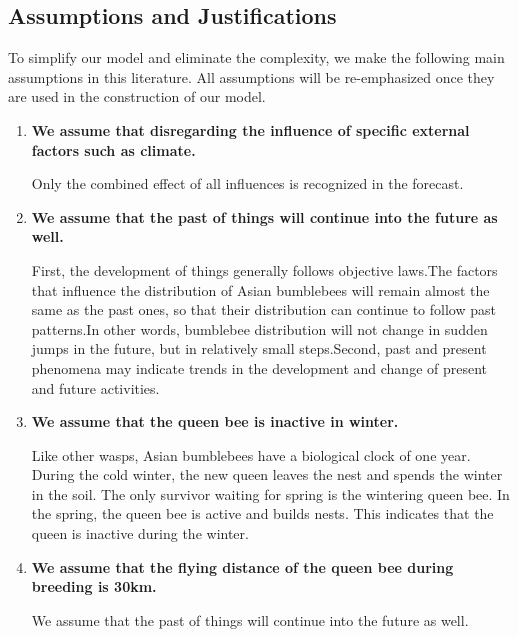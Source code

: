 \documentclass{mcmthesis}
\begin{document}
\subsection{Assumptions and Justifications}
To simplify our model and eliminate the complexity, we make the following main assumptions in this literature. All assumptions will be re-emphasized once they are used in the construction of our model.
\begin{enumerate}
	\item \textbf{We assume that disregarding the influence of specific external factors such as climate.}
	
	Only the combined effect of all influences is recognized in the forecast.
	\item \textbf{We assume that the past of things will continue into the future as well.}
	
	First, the development of things generally follows objective laws.The factors that influence the distribution of Asian bumblebees will remain almost the same as  the past ones, so that their distribution can continue to follow past patterns.In other words, bumblebee distribution will not change in sudden jumps in the future, but in relatively small steps.Second, past and present phenomena may indicate trends in the development and change of present and future activities.
	\item \textbf{We assume that the queen bee is inactive in winter.}
	
	Like other wasps, Asian bumblebees have a biological clock of one year. During the cold winter, the new queen leaves the nest and spends the winter in the soil. The only survivor waiting for spring is the wintering queen bee. In the spring, the queen bee is active and builds nests. This indicates that the queen is inactive during the winter.
	\item \textbf{We assume that the flying distance of the queen bee during breeding is 30km.}
	
	We assume that the past of things will continue into the future as well.
	
\end{enumerate}
\hspace*{\fill}
\end{document}

